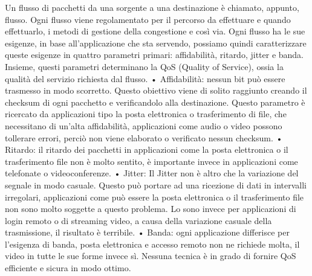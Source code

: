 Un flusso di pacchetti da una sorgente a una destinazione è chiamato, appunto, flusso.
Ogni flusso viene regolamentato per il percorso da effettuare e quando effettuarlo, i metodi di gestione della congestione e così via.
Ogni flusso ha le sue esigenze, in base all’applicazione che sta servendo, possiamo quindi caratterizzare queste esigenze in quattro parametri primari: affidabilità, ritardo, jitter e banda. Insieme, questi parametri determinano la QoS (Quality of Service), ossia la qualità del servizio richiesta dal flusso.
•	Affidabilità: nessun bit può essere trasmesso in modo scorretto. Questo obiettivo viene di solito raggiunto creando il checksum di ogni pacchetto e verificandolo alla destinazione. Questo parametro è ricercato da applicazioni tipo la posta elettronica o trasferimento di file, che necessitano di un’alta affidabilità, applicazioni come audio o video possono tollerare errori, perciò non viene elaborato o verificato nessun checksum.
•	Ritardo: il ritardo dei pacchetti in applicazioni come la posta elettronica o il trasferimento file non è molto sentito, è importante invece in applicazioni come telefonate o videoconferenze.
•	Jitter: Il Jitter non è altro che la variazione del segnale in modo casuale. Questo può portare ad una ricezione di dati in intervalli irregolari, applicazioni come può essere la posta elettronica o il trasferimento file non sono molto soggette a questo problema. Lo sono invece per applicazioni di login remoto o di streaming video, a causa della variazione casuale della trasmissione, il risultato è terribile.
•	Banda: ogni applicazione differisce per l’esigenza di banda, posta elettronica e accesso remoto non ne richiede molta, il video in tutte le sue forme invece sì.
Nessuna tecnica è in grado di fornire QoS efficiente e sicura in modo ottimo. 